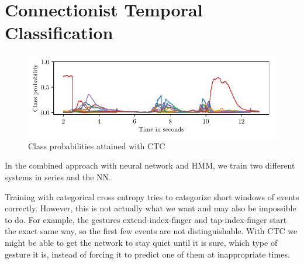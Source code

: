 
\begin{figure}[h]
  \centering
  \caption{}
  \label{fig:}
\end{figure}

\section{Connectionist Temporal Classification}
\label{sec:ctc}

\begin{figure}[h]
  \centering
  \includegraphics{figures/methods/ctc}
  \caption{Class probabilities attained with CTC}
  \label{fig:ctc-p}
\end{figure}

In the combined approach with neural network and HMM, we train two different
systems in series and the NN.

Training with categorical cross entropy tries to categorize short windows of events correctly.
However, this is not actually what we want and may also be impossible to do.
For example, the gestures extend-index-finger and tap-index-finger start the exact same way, so the first few events are not distinguishable.
With CTC we might be able to get the network to stay quiet until it is sure, which type of gesture it is, instead of forcing it to predict one of them at inappropriate times.


